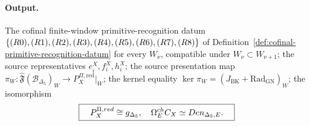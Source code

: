 \paragraph{Output.}
The cofinal finite-window primitive-recognition datum
\(\{\textup{(R0),(R1),(R2),(R3),(R4),(R5),(R6),(R7),(R8)}\}\) of
Definition~\ref{def:cofinal-primitive-recognition-datum} for every
\(W_\nu\), compatible under \(W_\nu\subset W_{\nu+1}\); the source
representatives
\(e_i^X,f_i^X,h_i^X\); the source presentation map
\(\pi_W:\widehat{\mathfrak F}(\mathscr B_{\Delta_5})_W
\to P_X^{\Pi,\mathrm{red}}\big|_W\); the kernel equality
\(\ker\pi_W=
(\overline{J_{\mathrm{BK}}+\mathrm{Rad}_{\mathrm{GN}}})_W\); the
isomorphism
\[
\boxed{\quad
P_X^{\Pi,\mathrm{red}}\cong\fg_{\Delta_5},\quad
\Omega_E^{\mathrm{ch}}C_X\simeq\mathsf{Den}_{\Delta_5,E}.
\quad}
\]

